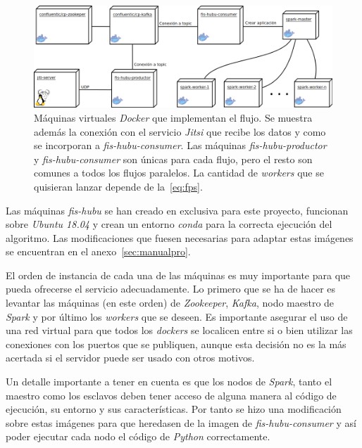 \begin{figure}
	\centering
	\includegraphics[width=\textwidth]{img/DespliegueDocker.png}
	\caption[Máquinas virtuales \textit{Docker} que implementan el flujo.]{Máquinas virtuales \textit{Docker} que implementan el flujo. Se muestra además la conexión con el servicio \textit{Jitsi} que recibe los datos y como se incorporan a \textit{fis-hubu-consumer}. Las máquinas \textit{fis-hubu-productor} y \textit{fis-hubu-consumer} son únicas para cada flujo, pero el resto son comunes a todos los flujos paralelos. La cantidad de \textit{workers} que se quisieran lanzar depende de la~\autoref{eq:fps}.}
	\label{fig:despligueDocker}
\end{figure}

Las máquinas \textit{fis-hubu} se han creado en exclusiva para este proyecto, funcionan sobre \textit{Ubuntu 18.04} y crean un entorno \textit{conda} para la correcta ejecución del algoritmo. Las modificaciones que fuesen necesarias para adaptar estas imágenes se encuentran en el anexo~\ref{sec:manualpro}. 

El orden de instancia de cada una de las máquinas es muy importante para que pueda ofrecerse el servicio adecuadamente. Lo primero que se ha de hacer es levantar las máquinas (en este orden) de \textit{Zookeeper}, \textit{Kafka}, nodo maestro de \textit{Spark} y por último los \textit{workers} que se deseen. Es importante asegurar el uso de una red virtual para que todos los \textit{dockers} se localicen entre si o bien utilizar las conexiones con los puertos que se publiquen, aunque esta decisión no es la más acertada si el servidor puede ser usado con otros motivos.

Un detalle importante a tener en cuenta es que los nodos de \textit{Spark}, tanto el maestro como los esclavos deben tener acceso de alguna manera al código de ejecución, su entorno y sus características. Por tanto se hizo una modificación sobre estas imágenes para que heredasen de la imagen de \textit{fis-hubu-consumer} y así poder ejecutar cada nodo el código de \textit{Python} correctamente.

